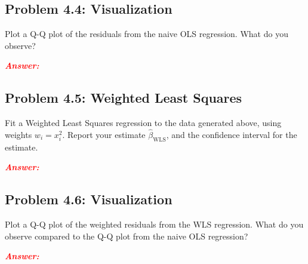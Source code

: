 \documentclass[11pt, letterpaper]{article}
\newcommand{\subproblem}[1]{\subsection*{Problem #1}}
\newcommand{\answer}{\textbf{\textit{\textcolor{red}{Answer:}}}\\}
\begin{document}
\subproblem{4.4: Visualization}

Plot a Q-Q plot of the residuals from the naive OLS regression. What do you observe?

\answer

\subproblem{4.5: Weighted Least Squares}

Fit a Weighted Least Squares regression to the data generated above, using weights $w_i = x_i^2$.
Report your estimate $\hat{\beta}_{\text{WLS}}$, and the confidence interval for the estimate.

\answer

\subproblem{4.6: Visualization}

Plot a Q-Q plot of the weighted residuals from the WLS regression. What do you observe compared
to the Q-Q plot from the naive OLS regression?

\answer
\end{document}

